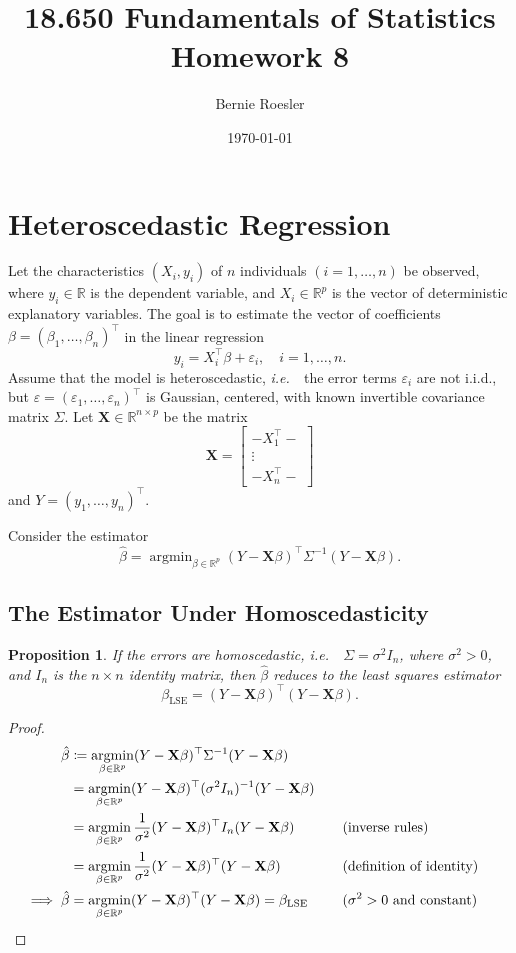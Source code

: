 \documentclass[letterpaper, reqno]{amsart}
\title[Homework 8 -- Problem \thesection]{18.650 Fundamentals of Statistics\\{\large Homework 8}}
\author{Bernie Roesler}
\date{\today}
\newtheorem{prop}{Proposition}[section]
\numberwithin{equation}{section}
\newcommand{\T}{\top} %
\newcommand{\vect}[1]{\boldsymbol{\mathbf{#1}}} %
\newcommand{\ie}{\emph{i.e.\ }}
\newcommand{\R}{\mathbb{R}}  %
\newcommand{\iid}{i.i.d.}
\newcommand{\by}[1]{&\quad&\text{(#1)}}
\newcommand{\Xm}{\vect{X}}
\newcommand{\Bv}{\beta}
\newcommand{\Bvh}{\hat{\beta}}
\newcommand{\ve}{\varepsilon}
\DeclareMathOperator*{\argmin}{argmin}
\begin{document}
\graphicspath{{./figures/}}

\maketitle

\section{Heteroscedastic Regression}
Let the characteristics $(X_i, y_i)$ of $n$ individuals $(i = 1, \dots, n)$ be
observed, where $y_i \in \R$ is the dependent variable, and $X_i \in \R^p$ is
the vector of deterministic explanatory variables. The goal is to estimate the
vector of coefficients $\Bv = (\beta_1, \dots, \beta_n)^\T$ in the linear
regression
\[ y_i = X_i^\T \Bv + \ve_i, \quad i = 1, \dots, n. \]
Assume that the model is heteroscedastic, \ie\ the error terms $\ve_i$
are not \iid, but $\ve = (\ve_1, \dots, \ve_n)^\T$ is Gaussian,
centered, with known invertible covariance matrix $\Sigma$. Let $\Xm \in \R^{n
  \times p}$ be the matrix
\[ \Xm = \begin{bmatrix} - X_1^\T - \\ \vdots \\ - X_n^\T - \end{bmatrix} \]
and $Y = (y_1, \dots, y_n)^\T$.

Consider the estimator
\[ \Bvh = \argmin_{\Bv \in \R^p} (Y - \Xm\Bv)^\T \Sigma^{-1} (Y - \Xm\Bv). \]

\subsection{The Estimator Under Homoscedasticity}
\begin{prop}
  If the errors are homoscedastic, \ie\ $\Sigma = \sigma^2 I_n$, where $\sigma^2 > 0$, and
  $I_n$ is the $n \times n$ identity matrix, then $\Bvh$ reduces to the least
  squares estimator
  \[ \beta_\mathrm{LSE} = (Y - \Xm\Bv)^\T(Y - \Xm\Bv). \]
\end{prop}

\begin{proof}
  \begin{alignat*}{3}
    \Bvh &\coloneqq \argmin_{\Bv \in \R^p} (Y - \Xm\Bv)^\T \Sigma^{-1} (Y - \Xm\Bv) \\
         &= \argmin_{\Bv \in \R^p} (Y - \Xm\Bv)^\T (\sigma^2 I_n)^{-1} (Y - \Xm\Bv) \\
         &= \argmin_{\Bv \in \R^p} \frac{1}{\sigma^2} (Y - \Xm\Bv)^\T I_n (Y - \Xm\Bv) \by{inverse rules} \\
         &= \argmin_{\Bv \in \R^p} \frac{1}{\sigma^2} (Y - \Xm\Bv)^\T (Y - \Xm\Bv) \by{definition of identity} \\
    \implies \Bvh &= \argmin_{\Bv \in \R^p} (Y - \Xm\Bv)^\T (Y - \Xm\Bv) = \beta_\mathrm{LSE} \by{$\sigma^2 > 0$ and constant} \qedhere
  \end{alignat*}
\end{proof}
\end{document}
